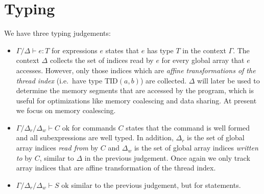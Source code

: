 \documentclass{article}
\newcommand{\of}{\!:\!}
\newcommand{\ok}{\text{ ok}}
\newcommand{\tid}[2]{\text{TID}(#1, #2)}
\renewcommand{\|}{\:|\:}
\begin{document}
\section{Typing}
We have three typing judgements: 
\begin{itemize} 
\item ${\Gamma}/{\Delta} {\vdash} e \of T$ for expressions $e$ states that $e$ has type $T$ in the context ${\Gamma}$. The context ${\Delta}$ collects the set of indices read by $e$ for every global array that $e$ accesses. However, only those indices which are \emph{affine transformations of the thread index} (i.e.\ have type $\tid{a}{b}$) are collected. ${\Delta}$ will later be used to determine the memory segments that are accessed by the program, which is useful for optimizations like memory coalescing and data sharing. At present we focus on memory coalescing.

\item ${\Gamma}/{\Delta}_r/{\Delta}_w {\vdash} C \ok$ for commands $C$ states that the command is well formed and all subexpressions are well typed. In addition, ${\Delta}_r$ is the set of global array indices \emph{read from} by $C$ and ${\Delta}_w$ is the set of global array indices \emph{written to} by $C$, similar to ${\Delta}$ in the previous judgement. Once again we only track array indices that are affine transformation of the thread index.

\item ${\Gamma}/{\Delta}_r/{\Delta}_w {\vdash} S \ok$ similar to the previous judgement, but for statements.
\end{itemize}
\end{document}
